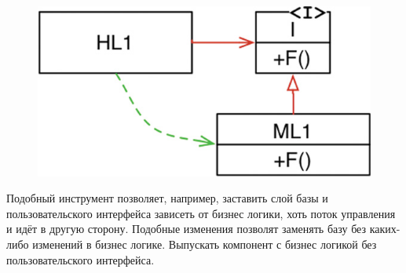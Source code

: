 \begin{figure}[h]
  \centering
    \includegraphics{inc/img/inverted}
  \label{img:direct:dep}
\end{figure}

Подобный инструмент позволяет, например, заставить слой базы и пользовательского интерфейса зависеть от бизнес логики, хоть поток управления и идёт в другую сторону. Подобные изменения позволят заменять базу без каких-либо изменений в бизнес логике. Выпускать компонент с бизнес логикой без пользовательского интерфейса.
